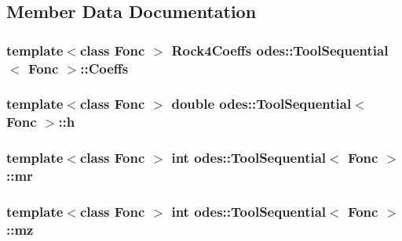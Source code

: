 \subsection{Member Data Documentation}
\hypertarget{classodes_1_1ToolSequential_a0aa8a52176b407d740953c0b07b00ae0}{
\subsubsection[{Coeffs}]{\setlength{\rightskip}{0pt plus 5cm}template$<$class Fonc $>$ {\bf Rock4\-Coeffs} {\bf odes\-::\-Tool\-Sequential}$<$ Fonc $>$\-::Coeffs\hspace{0.3cm}{\ttfamily [private]}}}\label{classodes_1_1ToolSequential_a0aa8a52176b407d740953c0b07b00ae0}
\hypertarget{classodes_1_1ToolSequential_ae7202d1172c35aa94d2d76642b8d6935}{
\subsubsection[{h}]{\setlength{\rightskip}{0pt plus 5cm}template$<$class Fonc $>$ double {\bf odes\-::\-Tool\-Sequential}$<$ Fonc $>$\-::h\hspace{0.3cm}{\ttfamily [private]}}}\label{classodes_1_1ToolSequential_ae7202d1172c35aa94d2d76642b8d6935}
\hypertarget{classodes_1_1ToolSequential_a6a4ceae2b6963e6f0e610ff4964f7365}{
\subsubsection[{mr}]{\setlength{\rightskip}{0pt plus 5cm}template$<$class Fonc $>$ int {\bf odes\-::\-Tool\-Sequential}$<$ Fonc $>$\-::mr\hspace{0.3cm}{\ttfamily [private]}}}\label{classodes_1_1ToolSequential_a6a4ceae2b6963e6f0e610ff4964f7365}
\hypertarget{classodes_1_1ToolSequential_ac5272f8a618d35954514a7002dad6536}{
\subsubsection[{mz}]{\setlength{\rightskip}{0pt plus 5cm}template$<$class Fonc $>$ int {\bf odes\-::\-Tool\-Sequential}$<$ Fonc $>$\-::mz\hspace{0.3cm}{\ttfamily [private]}}}\label{classodes_1_1ToolSequential_ac5272f8a618d35954514a7002dad6536}
